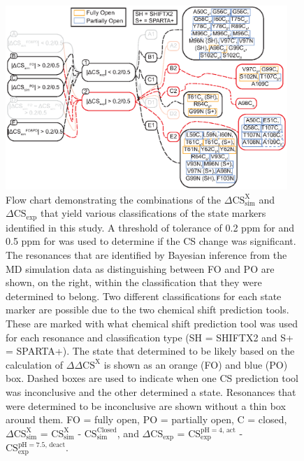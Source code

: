 \documentclass[%
 aip,
 amsmath,amssymb,
 preprint,%
]{revtex4-1}
\begin{document}
\begin{figure}[tbp]
\includegraphics[width=0.95\textwidth]{figures_SI/SI_Markers_FlowChart_v3-01.eps}
\caption{\label{SI_FlowChart} \scriptsize
    Flow chart demonstrating the combinations of the $\Delta\text{CS}_{\text{sim}}^{\text{X}}$ and $\Delta\text{CS}_{\text{exp}}$ that yield various classifications of the state markers identified in this study. A threshold of tolerance of 0.2 ppm for  and 0.5 ppm for  was used to determine if the CS change was significant. The resonances that are identified by Bayesian inference from the MD simulation data as distinguishing between FO and PO are shown, on the right, within the classification that they were determined to belong. Two different classifications for each state marker are possible due to the two chemical shift prediction tools. These are marked with what chemical shift prediction tool was used for each resonance and classification type (SH = SHIFTX2 and S+ = SPARTA+). The state that determined to be likely based on the calculation of $\Delta\Delta\text{CS}^{\text{X}}$ is shown as an orange (FO) and blue (PO) box. Dashed boxes are used to indicate when one CS prediction tool was inconclusive and the other determined a state. Resonances that were determined to be inconclusive are shown without a thin box around them. FO = fully open, PO = partially open, C = closed, $\Delta\text{CS}_{\text{sim}}^{\text{X}}$ = $\text{CS}_{\text{sim}}^{\text{X}}$ - $\text{CS}_{\text{sim}}^{\text{Closed}}$, and $\Delta\text{CS}_{\text{exp}}$ = $\text{CS}_{\text{exp}}^{\text{pH}=4\text{, act}}$ - $\text{CS}_{\text{exp}}^{\text{pH}=7.5\text{, deact}}$.}
\end{figure}
\end{document}
